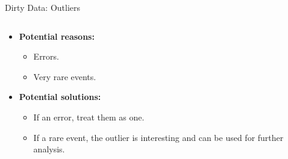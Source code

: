 \begin{frame}{Dirty Data: Outliers}
	\begin{columns}
		\begin{column}{0.45\textwidth}
			\begin{itemize}
				\item \textbf{Potential reasons:}
				      \begin{itemize}
					      \item Errors.
					      \item Very rare events.
				      \end{itemize}
				\item \textbf{Potential solutions:}
				      \begin{itemize}
					      \item If an error, treat them as one.
					      \item If a rare event, the outlier is interesting and can be
					            used for further analysis.
				      \end{itemize}
			\end{itemize}
		\end{column}

		\begin{column}{0.45\textwidth}
			\centering

			\vspace*{1cm}


		\end{column}
	\end{columns}

	\begin{columns}
		\begin{column}{0.9\textwidth}
			\centering


\end{column}
\end{columns}
\end{frame}
